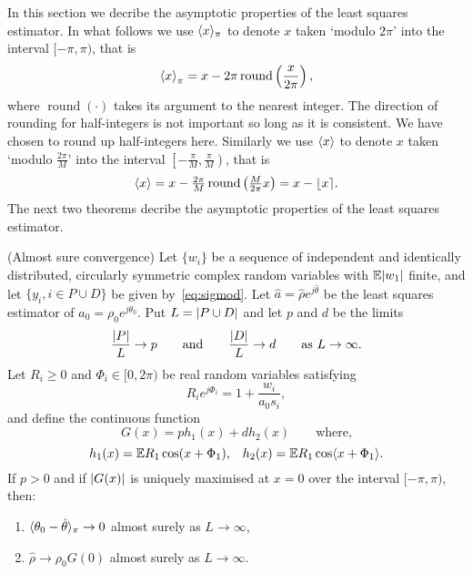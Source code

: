 \documentclass[journal]{IEEEtran}
\begin{document}
In this section we decribe the asymptotic properties of the least squares estimator.  In what follows we use $\langle x \rangle_\pi$ to denote $x$ taken `modulo $2\pi$' into the interval $[-\pi, \pi)$, that is
\[
\left\langle x \right\rangle_\pi = x - 2\pi\operatorname{round}\left(\frac{x}{2\pi}\right),
\]
where $\operatorname{round}(\cdot)$ takes its argument to the nearest integer.  The direction of rounding for half-integers is not important so long as it is consistent.  We have chosen to round up half-integers here.  Similarly we use $\langle x \rangle$ to denote $x$ taken `modulo $\tfrac{2\pi}{M}$' into the interval $\left[-\tfrac{\pi}{M}, \tfrac{\pi}{M}\right)$, that is
\[
\left\langle x \right\rangle = x - \tfrac{2\pi}{M}\operatorname{round}\left(\tfrac{M}{2\pi}x\right) = x - {\left\lfloor x \right\rceil}.
\]
The next two theorems decribe the asymptotic properties of the least squares estimator.

\begin{theorem}\label{thm:consistency} (Almost sure convergence)
Let $\{w_i\}$ be a sequence of independent and identically distributed, circularly symmetric complex random variables with ${\mathbb E} {\left\vert w_1 \right\vert}$ finite, and let $\{y_i, i \in P \cup D\}$ be given by~\eqref{eq:sigmod}.   Let $\hat{a} = \hat{\rho}e^{j\hat{\theta}}$ be the least squares estimator of $a_0 = \rho_0e^{j\theta_0}$. %
Put $L = {\left\vert P \cup D \right\vert}$ and let $p$ and $d$ be the limits
\[
\frac{{\left\vert P \right\vert}}{L} \rightarrow p \qquad \text{and} \qquad \frac{{\left\vert D \right\vert}}{L} \rightarrow d \qquad \text{as $L \rightarrow \infty$.}
\] 
Let $R_i \geq 0$ and $\Phi_i \in [0,2\pi)$ be real random variables satisfying
\begin{equation}\label{eq:RiandPhii}
R_ie^{j\Phi_i} = 1 + \frac{w_i}{a_0 s_i} ,
\end{equation}
and define the continuous function
\[
G(x) = p h_1(x) + d h_2(x) \qquad \text{where,}
\]
\[
h_1(x) = {\mathbb E} R_1 \cos(x + \Phi_1), \;\;\; h_2(x) =  {\mathbb E} R_1 \cos\langle  x + \Phi_1 \rangle.
\]
If $p > 0$ and if ${\left\vert G(x) \right\vert}$ is uniquely maximised at $x = 0$ over the interval $[-\pi,\pi)$, then:
\begin{enumerate}
\item $\langle \theta_0 - \hat{\theta} \rangle_\pi \rightarrow 0$ almost surely as $L \rightarrow \infty$,
\item $\hat{\rho} \rightarrow \rho_0 G(0)$ almost surely as $L \rightarrow \infty$.
\end{enumerate}
\end{theorem}
\end{document}
